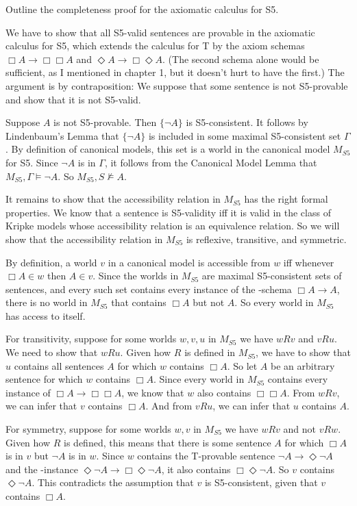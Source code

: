 \begin{exercise}
  Outline the completeness proof for the axiomatic calculus for S5.
\end{exercise}
\begin{solution}
  We have to show that all S5-valid sentences are provable in the axiomatic
  calculus for S5, which extends the calculus for T by the axiom schemas
  $\Box A \to \Box\Box A$ and $\Diamond A \to \Box\Diamond A$. (The second
  schema alone would be sufficient, as I mentioned in chapter 1, but it doesn't
  hurt to have the first.) The argument is by contraposition: We suppose that
  some sentence is not S5-provable and show that it is not S5-valid.

  Suppose $A$ is not S5-provable. Then $\{ \neg A \}$ is S5-consistent. It
  follows by Lindenbaum's Lemma that $\{ \neg A \}$ is included in some maximal
  S5-consistent set $\Gamma$. By definition of canonical models, this set is a
  world in the canonical model $M_{S5}$ for S5. Since $\neg A$ is in $\Gamma$,
  it follows from the Canonical Model Lemma that $M_{S5},\Gamma \models \neg A$.
  So $M_{S5},S \not\models A$.

  It remains to show that the accessibility relation in $M_{S5}$ has the right
  formal properties. We know that a sentence is S5-validity iff it is valid in
  the class of Kripke models whose accessibility relation is an equivalence
  relation. So we will show that the accessibility relation in $M_{S5}$ is reflexive, transitive, and symmetric.

  By definition, a world $v$ in a canonical model is accessible from $w$ iff
  whenever $\Box A \in w$ then $A \in v$. Since the worlds in $M_{S5}$ are
  maximal S5-consistent sets of sentences, and every such set contains every
  instance of the -schema $\Box A \to A$, there is no world in $M_{S5}$
  that contains $\Box A$ but not $A$. So every world in $M_{S5}$ has access to
  itself.

  For transitivity, suppose for some worlds $w,v,u$ in $M_{S5}$ we have $wRv$
  and $vRu$. We need to show that $wRu$. Given how $R$ is defined in $M_{S5}$,
  we have to show that $u$ contains all sentences $A$ for which $w$ contains
  $\Box A$. So let $A$ be an arbitrary sentence for which $w$ contains $\Box
  A$. Since every world in $M_{S5}$ contains every instance of
  $\Box A \to \Box\Box A$, we know that $w$ also contains $\Box\Box A$. From
  $wRv$, we can infer that $v$ contains $\Box A$. And from $vRu$, we can infer
  that $u$ contains $A$. 

  For symmetry, suppose for some worlds $w,v$ in $M_{S5}$ we have $wRv$ and not
  $vRw$. Given how $R$ is defined, this means that there is some sentence $A$
  for which $\Box A$ is in $v$ but $\neg A$ is in $w$. Since $w$ contains the
  T-provable sentence $\neg A \to \Diamond \neg A$ and the -instance
  $\Diamond \neg A \to \Box \Diamond \neg A$, it also contains
  $\Box \Diamond \neg A$. So $v$ contains $\Diamond \neg A$. This contradicts
  the assumption that $v$ is S5-consistent, given that $v$ contains $\Box A$. 
\end{solution}

